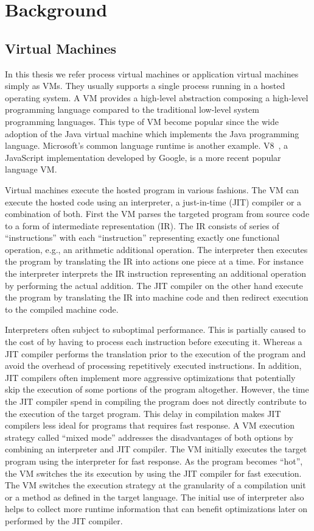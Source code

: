 \chapter{Background}
\label{chp:ch2-background}

\section{Virtual Machines}
\label{sec:ch2-virtual-machines}

In this thesis we refer process virtual machines or application virtual machines simply as VMs.
They usually supports a single process running in a hosted operating system.
A VM provides a high-level abstraction composing a high-level programming language compared to the traditional low-level system programming languages.
This type of VM become popular since the wide adoption of the Java virtual machine which implements the Java programming language.
Microsoft's common language runtime is another example.
V8~\cite{v8}, a JavaScript implementation developed by Google, is a more recent popular language VM.

Virtual machines execute the hosted program in various fashions.
The VM can execute the hosted code using an interpreter, a just-in-time (JIT) compiler or a combination of both.
First the VM parses the targeted program from source code to a form of intermediate representation (IR).
The IR consists of series of ``instructions'' with each ``instruction'' representing exactly one functional operation, e.g., an arithmetic additional operation.
The interpreter then executes the program by translating the IR into actions one piece at a time.
For instance the interpreter interprets the IR instruction representing an additional operation by performing the actual addition.
The JIT compiler on the other hand execute the program by translating the IR into machine code and then redirect execution to the compiled machine code.

Interpreters often subject to suboptimal performance.
This is partially caused to the cost of by having to process each instruction before executing it.
Whereas a JIT compiler performs the translation prior to the execution of the program and avoid the overhead of processing repetitively executed instructions.
In addition, JIT compilers often implement more aggressive optimizations that potentially skip the execution of some portions of the program altogether.
However, the time the JIT compiler spend in compiling the program does not directly contribute to the execution of the target program.
This delay in compilation makes JIT compilers less ideal for programs that requires fast response.
A VM execution strategy called ``mixed mode'' addresses the disadvantages of both options by combining an interpreter and JIT compiler.
The VM initially executes the target program using the interpreter for fast response.
As the program becomes ``hot'', the VM switches the its execution by using the JIT compiler for fast execution.
The VM switches the execution strategy at the granularity of a compilation unit or a method as defined in the target language.
The initial use of interpreter also helps to collect more runtime information that can benefit optimizations later on performed by the JIT compiler.


